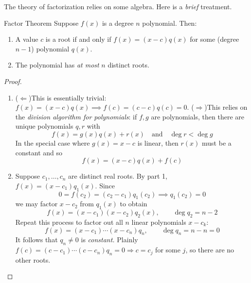 \goodbreak




The theory of factorization relies on some algebra. Here is a \emph{brief} treatment.

\begin{thm}{Factor Theorem}{}
	Suppose $f(x)$ is a degree $n$ polynomial. Then:
	\begin{enumerate}
	  \item A value $c$ is a root if and only if $f(x)=(x-c)q(x)$ for some (degree $n-1$) polynomial $q(x)$.
	  \item The polynomial has \emph{at most} $n$ distinct roots.
	\end{enumerate} 
\end{thm}

\begin{proof}
	\begin{enumerate}
	  \item ($\Leftarrow$)\lstsp This is essentially trivial: $f(x)=(x-c)q(x)\implies f(c)=(c-c)q(c)=0$.\smallbreak
		($\Rightarrow$)\lstsp This relies on the \emph{division algorithm for polynomials}: if $f,g$ are polynomials, then there are unique polynomials $q,r$ with\footnotemark{}
		\[
			f(x)=g(x)q(x)+r(x)\quad \text{and}\quad \deg r<\deg g
		\]
		In the special case where $g(x)=x-c$ is linear, then $r(x)$ must be a constant and so
		\[
			f(x)=(x-c)q(x)+f(c)
		\]
		\item Suppose $c_1,\ldots,c_n$ are distinct real roots. By part 1, $f(x)=(x-c_1)q_1(x)$. Since
		\[
			0=f(c_2)=(c_2-c_1)q_1(c_2)\implies q_1(c_2)=0
		\]
		we may factor $x-c_2$ from $q_1(x)$ to obtain
		\[
			f(x)=(x-c_1)(x-c_2)q_2(x),\qquad \deg q_2=n-2
		\]
		Repeat this process to factor out all $n$ linear polynomials $x-c_k$:
		\[
			f(x)=(x-c_1)\cdots(x-c_n)q_n,\qquad \deg q_n=n-n=0
		\]
		It follows that $q_n\neq 0$ is \emph{constant.} Plainly $f(c)=(c-c_1)\cdots(c-c_n)q_n=0\Longrightarrow c=c_j$ for some $j$, so there are no other roots.\qedhere
	\end{enumerate}
\end{proof}

